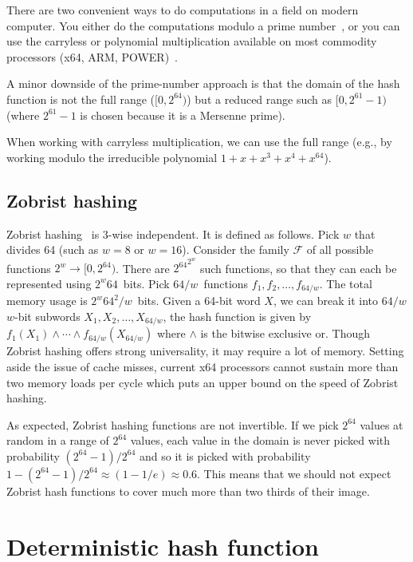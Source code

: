 \documentclass{article}
\newcommand\xor{\wedge}
\begin{document}
There are two convenient ways to do computations in a field on modern computer. You either do the computations modulo a prime number~\cite{carter1979universal,Thorup:2004:TBH:982792.982884}, or you can use the carryless or polynomial multiplication available on most commodity processors (x64, ARM, POWER)~\cite{Lemire2016}.

 A minor downside of the prime-number approach is that the domain of the hash function is not the full range ($[0,2^{64})$) but a reduced range such as $[0, 2^{61}-1)$ (where $2^{61}-1$ is chosen because it is a Mersenne prime). 
 
 When working with carryless multiplication, we can use the full range (e.g., by working modulo the irreducible polynomial $1+x+x^3+x^4+x^{64}$).



\subsection{Zobrist hashing}


Zobrist hashing~\cite{zobrist1970, zobrist1990new,thorup2012tabulation,Patrascu:2012:PST:2220357.2220361} is 3-wise independent. It is defined as follows. Pick $w$ that divides 64 (such as $w=8$ or $w=16$).
Consider the family $\mathcal{F}$ of all possible functions $2^w \to [0,2^{64})$. There are ${2^{64}}^{2^w}$ such functions, so that they can each be represented using $2^w 64$~bits. Pick $64/w$~functions $f_1, f_2, \ldots, f_{64/w}$. The total memory usage is $2^w 64^2/w$~bits. 
Given a 64-bit word $X$, we can break it into $64/w$ $w$-bit subwords $X_1,X_2, \ldots, X_{64/w}$, 
the hash function is given by $ f_1(X_1) \xor \cdots \xor  f_{64/w}(X_{64/w})$ where $\xor{}$ is the bitwise exclusive or. Though Zobrist hashing offers strong universality, it may require a lot of memory. Setting aside the issue of cache misses, current x64 processors cannot sustain more than two memory loads per cycle which puts an upper bound on the speed of Zobrist hashing.

As expected, Zobrist hashing functions are not invertible.
If we pick $2^{64}$ values at random in a range of $2^{64}$ values, each value in the domain is never picked with probability $(2^{64}-1)/2^{64}$ and so it is picked with probability  $1-(2^{64}-1)/2^{64} \approx (1-1/e) \approx 0.6$. This means that we should not expect Zobrist hash functions to cover much more than two thirds of their image.

\section{Deterministic hash function}
\end{document}
